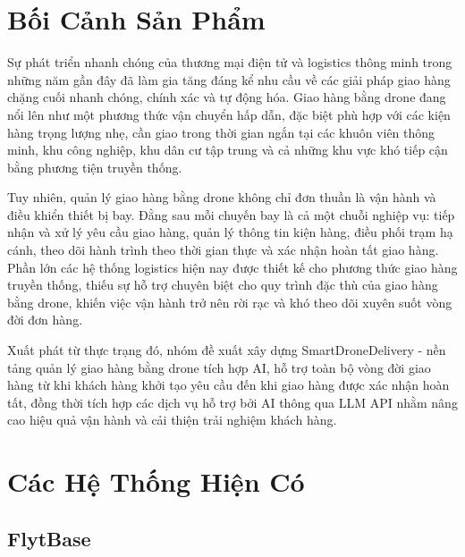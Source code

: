 \section{Bối Cảnh Sản Phẩm}

Sự phát triển nhanh chóng của thương mại điện tử và logistics thông minh trong những năm gần đây đã làm gia tăng đáng kể nhu cầu về các giải pháp giao hàng chặng cuối nhanh chóng, chính xác và tự động hóa. Giao hàng bằng drone đang nổi lên như một phương thức vận chuyển hấp dẫn, đặc biệt phù hợp với các kiện hàng trọng lượng nhẹ, cần giao trong thời gian ngắn tại các khuôn viên thông minh, khu công nghiệp, khu dân cư tập trung và cả những khu vực khó tiếp cận bằng phương tiện truyền thống.

Tuy nhiên, quản lý giao hàng bằng drone không chỉ đơn thuần là vận hành và điều khiển thiết bị bay. Đằng sau mỗi chuyến bay là cả một chuỗi nghiệp vụ: tiếp nhận và xử lý yêu cầu giao hàng, quản lý thông tin kiện hàng, điều phối trạm hạ cánh, theo dõi hành trình theo thời gian thực và xác nhận hoàn tất giao hàng. Phần lớn các hệ thống logistics hiện nay được thiết kế cho phương thức giao hàng truyền thống, thiếu sự hỗ trợ chuyên biệt cho quy trình đặc thù của giao hàng bằng drone, khiến việc vận hành trở nên rời rạc và khó theo dõi xuyên suốt vòng đời đơn hàng.

Xuất phát từ thực trạng đó, nhóm đề xuất xây dựng SmartDroneDelivery - nền tảng quản lý giao hàng bằng drone tích hợp AI, hỗ trợ toàn bộ vòng đời giao hàng từ khi khách hàng khởi tạo yêu cầu đến khi giao hàng được xác nhận hoàn tất, đồng thời tích hợp các dịch vụ hỗ trợ bởi AI thông qua LLM API nhằm nâng cao hiệu quả vận hành và cải thiện trải nghiệm khách hàng.

\section{Các Hệ Thống Hiện Có}

\subsection{FlytBase}

